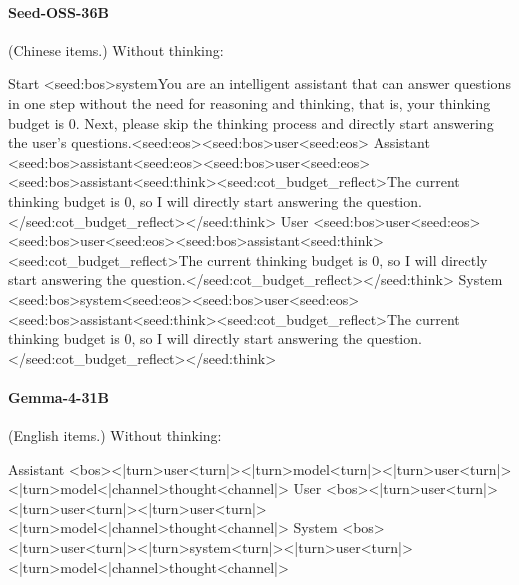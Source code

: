 \paragraph{Seed-OSS-36B} (Chinese items.)
\noindent Without thinking:
\begin{Rendering}
Start      <seed:bos>system\NL{}You are an intelligent assistant that can answer questions in one step without the need for reasoning and thinking, that is, your thinking budget is 0. Next, please skip the thinking process and directly start answering the user's questions.\NL{}<seed:eos><seed:bos>user\NL{}<seed:eos>
Assistant  <seed:bos>assistant\NL{}<seed:eos><seed:bos>user\NL{}<seed:eos><seed:bos>assistant\NL{}<seed:think>\NL{}<seed:cot_budget_reflect>The current thinking budget is 0, so I will directly start answering the question.</seed:cot_budget_reflect>\NL{}</seed:think>
User       <seed:bos>user\NL{}<seed:eos><seed:bos>user\NL{}<seed:eos><seed:bos>assistant\NL{}<seed:think>\NL{}<seed:cot_budget_reflect>The current thinking budget is 0, so I will directly start answering the question.</seed:cot_budget_reflect>\NL{}</seed:think>
System     <seed:bos>system\NL{}<seed:eos><seed:bos>user\NL{}<seed:eos><seed:bos>assistant\NL{}<seed:think>\NL{}<seed:cot_budget_reflect>The current thinking budget is 0, so I will directly start answering the question.</seed:cot_budget_reflect>\NL{}</seed:think>
\end{Rendering}
\paragraph{Gemma-4-31B} (English items.)
\noindent Without thinking:
\begin{Rendering}
Assistant  <bos><|turn>user\NL{}<turn|>\NL{}<|turn>model\NL{}<turn|>\NL{}<|turn>user\NL{}<turn|>\NL{}<|turn>model\NL{}<|channel>thought\NL{}<channel|>
User       <bos><|turn>user\NL{}<turn|>\NL{}<|turn>user\NL{}<turn|>\NL{}<|turn>user\NL{}<turn|>\NL{}<|turn>model\NL{}<|channel>thought\NL{}<channel|>
System     <bos><|turn>user\NL{}<turn|>\NL{}<|turn>system\NL{}<turn|>\NL{}<|turn>user\NL{}<turn|>\NL{}<|turn>model\NL{}<|channel>thought\NL{}<channel|>
\end{Rendering}
